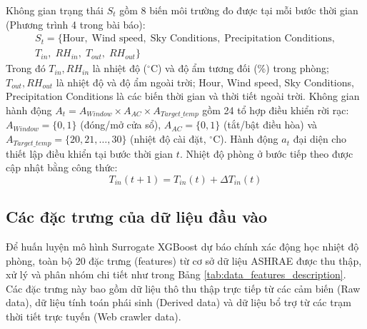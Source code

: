 \documentclass[12pt, a4paper]{report}
\begin{document}
Không gian trạng thái $S_t$ gồm 8 biến môi trường đo được tại mỗi bước thời gian (Phương trình 4 trong bài báo):
\begin{equation}
\begin{split}
S_t = \{\text{Hour},\; \text{Wind speed},\; \text{Sky Conditions},\; \text{Precipitation Conditions},\\
T_{in},\; RH_{in},\; T_{out},\; RH_{out}\}
\end{split}
\end{equation}
Trong đó $T_{in}, RH_{in}$ là nhiệt độ ($^\circ\text{C}$) và độ ẩm tương đối (\%) trong phòng; $T_{out}, RH_{out}$ là nhiệt độ và độ ẩm ngoài trời; Hour, Wind speed, Sky Conditions, Precipitation Conditions là các biến thời gian và thời tiết ngoài trời. Không gian hành động $A_t = A_{Window} \times A_{AC} \times A_{Target\_temp}$ gồm 24 tổ hợp điều khiển rời rạc: $A_{Window} = \{0, 1\}$ (đóng/mở cửa sổ), $A_{AC} = \{0, 1\}$ (tắt/bật điều hòa) và $A_{Target\_temp} = \{20, 21, \ldots, 30\}$ (nhiệt độ cài đặt, $^\circ\text{C}$).
Hành động $a_t$ đại diện cho thiết lập điều khiển tại bước thời gian $t$. Nhiệt độ phòng ở bước tiếp theo được cập nhật bằng công thức:
\begin{equation}
T_{in}(t+1) = T_{in}(t) + \Delta T_{in}(t)
\end{equation}

\subsection{Các đặc trưng của dữ liệu đầu vào}
Để huấn luyện mô hình Surrogate XGBoost dự báo chính xác động học nhiệt độ phòng, toàn bộ 20 đặc trưng (features) từ cơ sở dữ liệu ASHRAE được thu thập, xử lý và phân nhóm chi tiết như trong Bảng \ref{tab:data_features_description}. Các đặc trưng này bao gồm dữ liệu thô thu thập trực tiếp từ các cảm biến (Raw data), dữ liệu tính toán phái sinh (Derived data) và dữ liệu bổ trợ từ các trạm thời tiết trực tuyến (Web crawler data).
\end{document}
